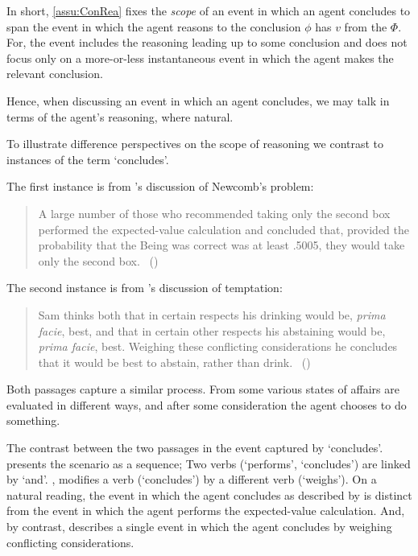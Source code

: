 \begin{note}
  In short, \autoref{assu:ConRea} fixes the \emph{scope} of an event in which an agent concludes to span the event in which the agent reasons to the conclusion \(\phi\) has  \(v\) from the \pool{} \(\Phi\).
  For, the event includes the reasoning leading up to some conclusion and does not focus only on a more-or-less instantaneous event in which the agent makes the relevant conclusion.

    Hence, when discussing an event in which an agent concludes, we may talk in terms of the agent's reasoning, where natural.
\end{note}


\begin{note}
  To illustrate difference perspectives on the scope of reasoning we contrast to instances of the term `concludes'.

  The first instance is from \citeauthor{Gardner:1986wp}'s discussion of Newcomb's problem:
  \begin{quote}
    A large number of those who recommended taking only the second box performed the expected-value calculation and concluded that, provided the probability that the Being was correct was at least .5005, they would take only the second box.%
    \mbox{ }\hfill\mbox{(\citeyear[166]{Gardner:1986wp})}
  \end{quote}
  The second instance is from \citeauthor{Bratman:1979aa}'s discussion of temptation:
  \begin{quote}
    Sam thinks both that in certain respects his drinking would be, \emph{prima facie}, best, and that in certain other respects his abstaining would be, \emph{prima facie}, best.
    Weighing these conflicting considerations he concludes that it would be best to abstain, rather than drink.%
    \mbox{ }\hfill\mbox{(\citeyear[156]{Bratman:1979aa})}
  \end{quote}
  Both passages capture a similar process.
  From some \agpe{} various states of affairs are evaluated in different ways, and after some consideration the agent chooses to do something.

  The contrast between the two passages in the event captured by `concludes'.
  \citeauthor{Gardner:1986wp} presents the scenario as a sequence;
  Two verbs (`performs', `concludes') are linked by `and'.
  \citeauthor{Bratman:1979aa}, modifies a verb (`concludes') by a different verb (`weighs').
  On a natural reading, the event in which the agent concludes as described by \citeauthor{Gardner:1986wp} is distinct from the event in which the agent performs the expected-value calculation.
  And, by contrast, \citeauthor{Bratman:1979aa} describes a single event in which the agent concludes by weighing conflicting considerations.


\end{note}

